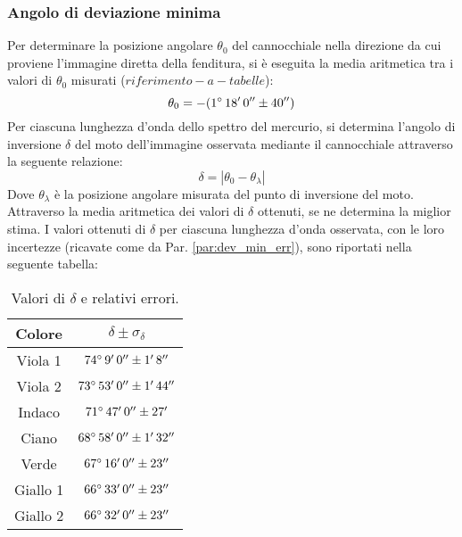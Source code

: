 \documentclass[]{article}
\begin{document}
    \subsubsection{Angolo di deviazione minima}
    Per determinare la posizione angolare $\theta_0$ del cannocchiale nella direzione da cui proviene l'immagine diretta della fenditura, si è eseguita la media aritmetica tra i valori di $\theta_0$ misurati ($riferimento-a-tabelle$):
    \begin{equation}
        \label{theta-0}
        \theta_0 = -(1 \degree \, 18' \, 0'' \pm 40'') 
    \end{equation}
    Per ciascuna lunghezza d'onda dello spettro del mercurio, si determina l'angolo di inversione $\delta$ del moto dell'immagine osservata mediante il cannocchiale attraverso la seguente relazione:
    \begin{equation}
        \label{delta}
        \delta = | \theta_0 - \theta_{\lambda}|
    \end{equation}
    Dove $\theta_{\lambda}$ è la posizione angolare misurata del punto di inversione del moto.
    Attraverso la media aritmetica dei valori di $\delta$ ottenuti, se ne determina la miglior stima. I valori ottenuti di $\delta$ per ciascuna lunghezza d'onda osservata, con le loro incertezze (ricavate come da Par. \ref{par:dev_min_err}), sono riportati nella seguente tabella:
    \begin{table} [H]
        \centering
        \begin{tabular}{||c|c||}
            \hline
            Colore & $\delta \pm \sigma_{\delta}$\\
            \hline \hline
            Viola 1 & $ 74 \degree \, 9' \, 0'' \pm 1' \, 8'' $ \\\hline
            Viola 2 & $ 73 \degree \, 53'\, 0'' \pm 1' \, 44'' $ \\\hline
            Indaco & $ 71 \degree \, 47'\, 0'' \pm 27'  $ \\\hline
            Ciano & $ 68 \degree \, 58'\, 0'' \pm 1' \, 32'' $ \\\hline
            Verde & $ 67 \degree \, 16'\, 0'' \pm 23'' $ \\\hline
            Giallo 1 & $ 66 \degree \, 33'\, 0'' \pm 23'' $ \\\hline
            Giallo 2 & $ 66 \degree \, 32' \, 0''\pm 23'' $ \\\hline
        \end{tabular}
        \caption{Valori di $\delta$ e relativi errori.}
        \label{d-values}
    \end{table}
\end{document}
